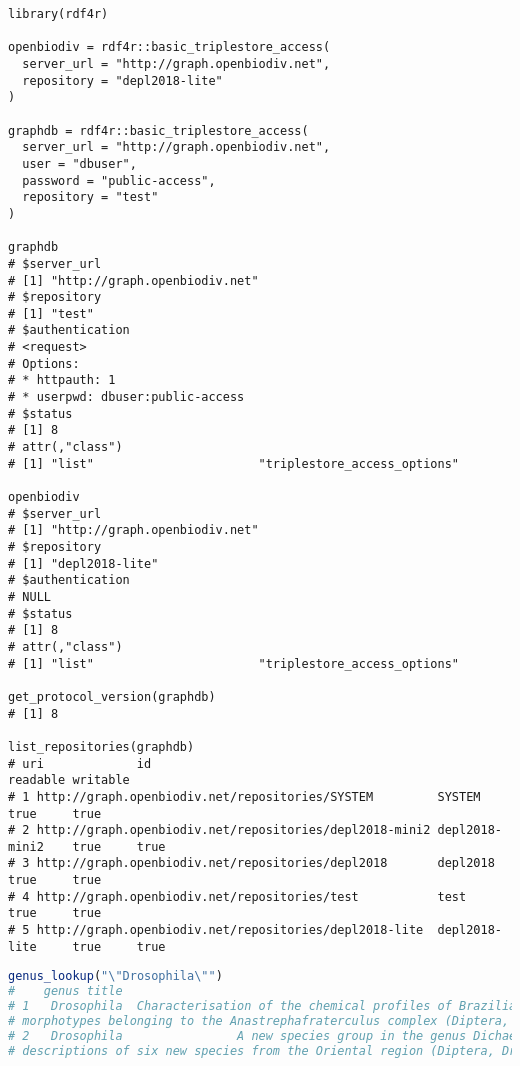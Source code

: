 \begin{lstlisting}[language=SPARQL,
caption=R code: connecting to an RDF database using RDF4R. Outputs are given as comments after the statements.,
label=fig:rdf4r-connecting-graphdb,
basicstyle=\ttfamily\scriptsize]
library(rdf4r)

openbiodiv = rdf4r::basic_triplestore_access(
  server_url = "http://graph.openbiodiv.net",
  repository = "depl2018-lite"
)

graphdb = rdf4r::basic_triplestore_access(
  server_url = "http://graph.openbiodiv.net",
  user = "dbuser",
  password = "public-access",
  repository = "test"
)

graphdb
# $server_url
# [1] "http://graph.openbiodiv.net"
# $repository
# [1] "test"
# $authentication
# <request>
# Options:
# * httpauth: 1
# * userpwd: dbuser:public-access
# $status
# [1] 8
# attr(,"class")
# [1] "list"                       "triplestore_access_options"

openbiodiv
# $server_url
# [1] "http://graph.openbiodiv.net"
# $repository
# [1] "depl2018-lite"
# $authentication
# NULL
# $status
# [1] 8
# attr(,"class")
# [1] "list"                       "triplestore_access_options"

get_protocol_version(graphdb)
# [1] 8

list_repositories(graphdb)
# uri             id                                                 readable writable
# 1 http://graph.openbiodiv.net/repositories/SYSTEM         SYSTEM   true     true
# 2 http://graph.openbiodiv.net/repositories/depl2018-mini2 depl2018-mini2    true     true
# 3 http://graph.openbiodiv.net/repositories/depl2018       depl2018 true     true
# 4 http://graph.openbiodiv.net/repositories/test           test     true     true
# 5 http://graph.openbiodiv.net/repositories/depl2018-lite  depl2018-lite     true     true
\end{lstlisting}





\begin{lstlisting}[language=R,
label=listing-genus-lookup,
basicstyle=\ttfamily\scriptsize]
genus_lookup("\"Drosophila\"")
#    genus title
# 1   Drosophila  Characterisation of the chemical profiles of Brazilian and Andean
# morphotypes belonging to the Anastrephafraterculus complex (Diptera, Tephritidae)
# 2   Drosophila                A new species group in the genus Dichaetophora, with
# descriptions of six new species from the Oriental region (Diptera, Drosophilidae)
\end{lstlisting}

